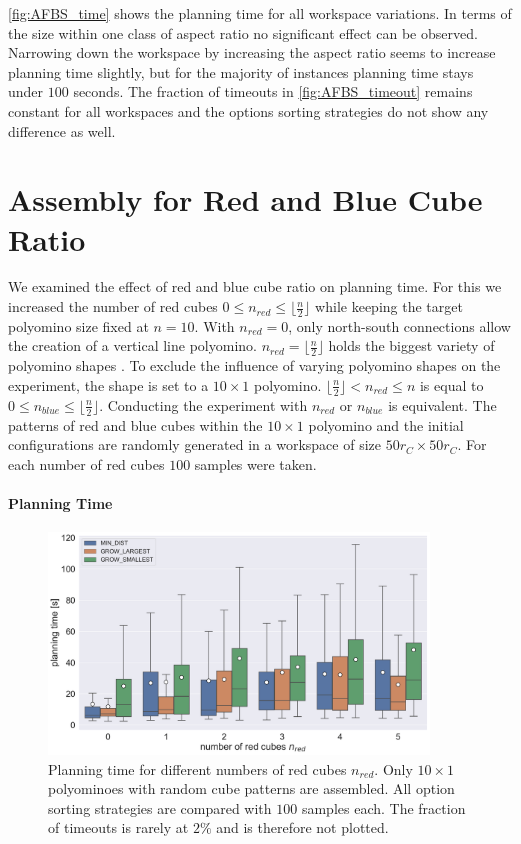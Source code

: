 \autoref{fig:AFBS_time} shows the planning time for all workspace variations.
In terms of the size within one class of aspect ratio no significant effect can be observed.
Narrowing down the workspace by increasing the aspect ratio seems to increase planning time slightly, but for the majority of instances planning time stays under $100$ seconds.
The fraction of timeouts in \autoref{fig:AFBS_timeout} remains constant for all workspaces and the options sorting strategies do not show any difference as well.



\section{Assembly for Red and Blue Cube Ratio}
\label{sec:AFNR}

We examined the effect of red and blue cube ratio on planning time.
For this we increased the number of red cubes $0 \leq n_\textit{red} \leq \lfloor \frac{n}{2}\rfloor$ while keeping the target polyomino size fixed at $n = 10$.
With $n_\textit{red} = 0$, only north-south connections allow the creation of a vertical line polyomino.
$n_\textit{red} = \lfloor \frac{n}{2}\rfloor$ holds the biggest variety of polyomino shapes \cite{Lu2021}.
To exclude the influence of varying polyomino shapes on the experiment, the shape is set to a $10 \times 1$ polyomino.
$\lfloor \frac{n}{2}\rfloor < n_\textit{red} \leq n$ is equal to $0 \leq n_\textit{blue} \leq \lfloor \frac{n}{2}\rfloor$.
Conducting the experiment with $n_\textit{red}$ or $n_\textit{blue}$ is equivalent.
The patterns of red and blue cubes within the $10 \times 1$ polyomino and the initial configurations are randomly generated in a workspace of size $50 r_C \times 50 r_C$.
For each number of red cubes $100$ samples were taken.

\paragraph{Planning Time}

\begin{figure}
	\centering
	\includegraphics[width=0.9\textwidth]{figures/plots/AFNR_time.pdf}
	\caption[Planning time for number of red cubes]{Planning time for different numbers of red cubes $n_\textit{red}$. Only $10 \times 1$ polyominoes with random cube patterns are assembled. All option sorting strategies are compared with $100$ samples each. The fraction of timeouts is rarely at $2\%$ and is therefore not plotted.}
	\label{fig:AFNR_time}
\end{figure}


